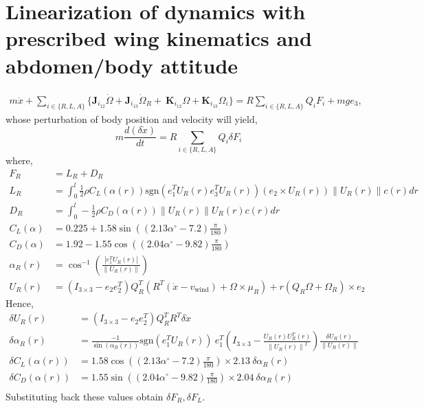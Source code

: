 \documentclass[10pt]{article}
\newcommand{\norm}[1]{\ensuremath{\left\| #1 \right\|}}
\begin{document}
\section{Linearization of dynamics with prescribed wing kinematics and abdomen/body attitude}

\begin{align*}
m\ddot x + 
\sum_{i\in\{R,L,A\}} \big\{ \mathbf{J}_{i_{12}} \dot\Omega + \mathbf{J}_{i_{13}}\dot\Omega_R 
+ \ \mathbf{K}_{i_{12}}\Omega + \mathbf{K}_{i_{13}}\Omega_i \big\} = R\sum_{i\in\{R,L,A\}} Q_i F_i + mg e_3,\label{eqn:mx_ddot}
\end{align*}
whose perturbation of body position and velocity will yield,
\begin{equation}
	m \frac{d (\delta \dot{x} )}{dt} = R \sum_{i\in\{R,L,A\}} Q_i \delta F_i
\end{equation}
where,
\begin{align*}
	F_R &= L_R + D_R \\
	L_R &= \int_{0}^{l} \frac{1}{2}\rho  C_L(\alpha(r)) \mathrm{sgn} (e_1^T U_R(r) e_3^T U_R(r)) (e_2\times U_R(r))\|U_R(r)\| c(r) dr \\
	D_R &= \int_{0}^{l} - \frac{1}{2}\rho  C_D(\alpha(r)) \|U_R(r)\|U_R(r) c(r) dr \\
	C_L(\alpha) & = 0.225 + 1.58 \sin( (2.13\alpha^\circ - 7.2) \frac{\pi}{180}) \\
	C_D(\alpha) & = 1.92 - 1.55 \cos( (2.04 \alpha^\circ - 9.82 ) \frac{\pi}{180}) \\
	\alpha_R (r) & = \cos^{-1} ( \frac{|e_1^T U_R(r)|}{\|U_R(r)\|} ) \\
	U_R(r) &= (I_{3\times 3}- e_2 e_2^T) Q_R^T( R^T (\dot x-v_{\mathrm{wind}}) + \Omega\times \mu_R ) + r  (Q_R\Omega + \Omega_R )\times e_2
\end{align*}
Hence,
\begin{align*}
	\delta U_R(r) &= (I_{3\times 3}- e_2 e_2^T) Q_R^T R^T \delta\dot x \\
	\delta \alpha_R(r) &= \frac{-1}{\sin(\alpha_R(r))} \mathrm{sgn}(e_1^T U_R(r))\ e_1^T\left(I_{3\times 3} - \frac{U_R(r)U_R^T(r)}{\norm{U_R(r)}^2}\right) \frac{\delta U_R(r)}{\norm{U_R(r)}} \\
	\delta C_L(\alpha(r)) &= 1.58 \cos( (2.13\alpha^\circ - 7.2) \frac{\pi}{180}) \times 2.13\ \delta\alpha_R(r) \\
	\delta C_D(\alpha(r)) &= 1.55 \sin( (2.04 \alpha^\circ - 9.82 ) \frac{\pi}{180}) \times 2.04\ \delta\alpha_R(r) \\
\end{align*}
Substituting back these values obtain $ \delta F_R, \delta F_L $.
\end{document}
